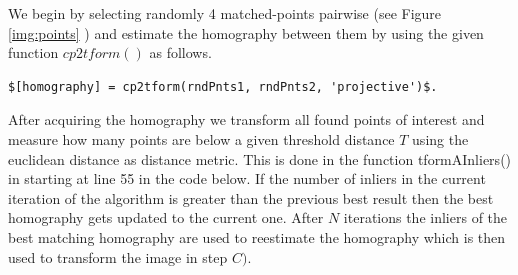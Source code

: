 \documentclass[subfigure,epsfig,fleqn,float,numbers=noenddot]{scrartcl}
\begin{document}
\par We begin by selecting randomly 4 matched-points pairwise (see Figure \ref{img:points} ) and estimate the homography between them by using the given function $cp2tform()$ as follows.
\begin{lstlisting}
$[homography] = cp2tform(rndPnts1, rndPnts2, 'projective')$. 
\end{lstlisting}
After acquiring the homography we transform all found points of interest and measure how many points are below a given threshold distance $T$ using the euclidean distance as distance metric. This is done in the function tformAInliers() in starting at line 55 in the code below. If the number of inliers in the current iteration of the algorithm is greater than the previous best result then the best homography gets updated to the current one. After $N$ iterations the inliers of the best matching homography are used to reestimate the homography which is then used to transform the image in step $C)$. 
\end{document}
